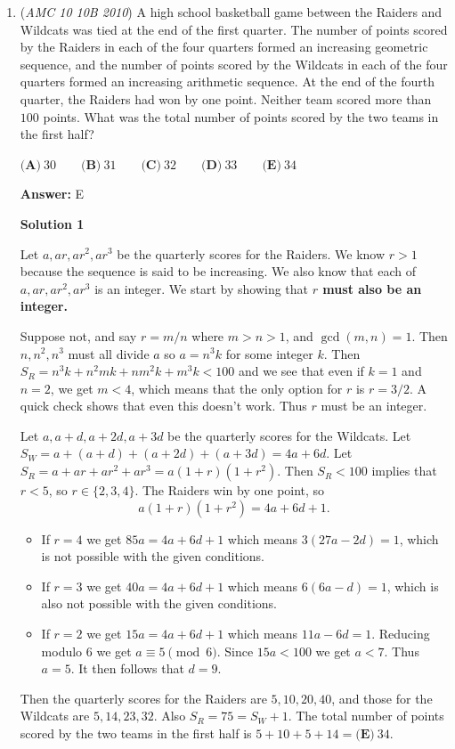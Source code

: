 \begin{enumerate}
 The answer to the problem is $12+12+18 = \boxed{\text{(D) }42}$ ways to make a chart in total.

 


	\item (\textit{AMC 10 10B 2010}) A high school basketball game between the Raiders and Wildcats was tied at the end of the first quarter. The number of points scored by the Raiders in each of the four quarters formed an increasing geometric sequence, and the number of points scored by the Wildcats in each of the four quarters formed an increasing arithmetic sequence. At the end of the fourth quarter, the Raiders had won by one point. Neither team scored more than $100$ points. What was the total number of points scored by the two teams in the first half?


 $\textbf{(A)}\ 30 \qquad \textbf{(B)}\ 31 \qquad \textbf{(C)}\ 32 \qquad \textbf{(D)}\ 33 \qquad \textbf{(E)}\ 34$

 \textbf{Answer: }E



\textbf{Solution 1}

Let $a,ar,ar^{2},ar^{3}$ be the quarterly scores for the Raiders. We know $r > 1$ because the sequence is said to be increasing. We also know that each of $a, ar, ar^2, ar^3$ is an integer. We start by showing that \textbf{$r$ must also be an integer.}

 Suppose not, and say $r = m/n$ where $m>n>1$, and $\gcd(m,n)=1$. Then $n, n^2, n^3$ must all divide $a$ so $a=n^3k$ for some integer $k$. Then $S_R = n^3k + n^2mk + nm^2k + m^3k < 100$ and we see that even if $k=1$ and $n=2$, we get $m < 4$, which means that the only option for $r$ is $r=3/2$. A quick check shows that even this doesn't work. Thus $r$ must be an integer.

 Let $a, a+d, a+2d, a+3d$ be the quarterly scores for the Wildcats. Let $S_W = a+(a+d) + (a+2d)+(a+3d) = 4a+6d$. Let $S_R = a+ar+ar^2+ar^3 = a(1+r)(1+r^2)$. Then $S_R<100$ implies that $r<5$, so $r\in \{2, 3, 4\}$. The Raiders win by one point, so
 \[a(1+r)(1+r^2) = 4a+6d+1.\]

            \begin{itemize}
        \item If $r=4$ we get $85a = 4a+6d+1$ which means $3(27a-2d) = 1$, which is not possible with the given conditions.
        \item If $r=3$ we get $40a = 4a+6d+1$ which means $6(6a-d) = 1$, which is also not possible with the given conditions.
        \item If $r=2$ we get $15a = 4a+6d+1$ which means $11a-6d = 1$. Reducing modulo 6 we get $a \equiv 5\pmod{6}$. Since $15a<100$ we get $a<7$. Thus $a=5$. It then follows that $d=9$.
            \end{itemize}
            Then the quarterly scores for the Raiders are $5, 10, 20, 40$, and those for the Wildcats are $5, 14, 23, 32$. Also $S_R = 75 = S_W + 1$. The total number of points scored by the two teams in the first half is $5+10+5+14=\boxed{\textbf{(E)}\ 34}$.


\end{enumerate}

